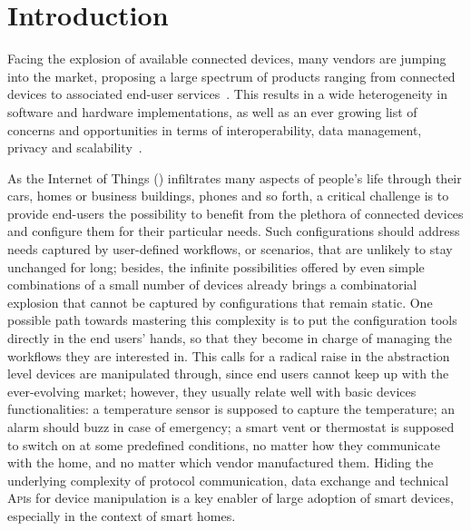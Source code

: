 \section{Introduction}
\label{sec:Introduction}

Facing the explosion of available connected devices, many vendors are jumping into the market, proposing a large spectrum of products ranging from connected devices to associated end-user services~\cite{lee-15}. This results in a wide heterogeneity in software and hardware implementations, as well as an ever growing list of concerns and opportunities in terms of interoperability, data management, privacy and scalability~\cite{chaqfeh-12}.

As the Internet of Things (\IOT) infiltrates many aspects of people's life through their cars, homes or business buildings, phones and so forth, a critical challenge is to provide end-users the possibility to benefit from the plethora of connected devices and configure them for their particular needs. Such configurations should address needs captured by user-defined workflows, or scenarios, that are unlikely to stay unchanged for long; besides, the infinite possibilities offered by even simple combinations of a small number of devices already brings a combinatorial explosion that cannot be captured by configurations that remain static. One possible path towards mastering this complexity is to put the configuration tools directly in the end users' hands, so that they become in charge of managing the workflows they are interested in. This calls for a radical raise in the abstraction level devices are manipulated through, since end users cannot keep up with the ever-evolving \IOT market; however, they usually relate well with basic devices functionalities: a temperature sensor is supposed to capture the temperature; an alarm should buzz in case of emergency; a smart vent or thermostat is supposed to switch on at some predefined conditions, no matter how they communicate with the home, and no matter which vendor manufactured them. Hiding the underlying complexity of protocol communication, data exchange and technical \textsc{Api}s for device manipulation is a key enabler of large adoption of smart devices, especially in the context of smart homes. 


